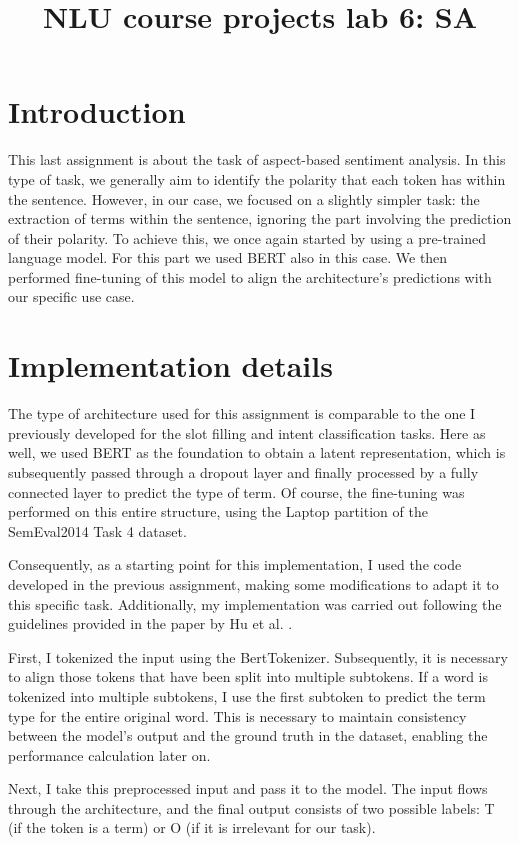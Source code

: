 \documentclass[a4paper]{article}
\title{NLU course projects lab 6: SA}
\begin{document}
\maketitle

\section{Introduction}
This last assignment is about the task of aspect-based sentiment analysis.
In this type of task, we generally aim to identify the polarity that each token has within the sentence. However, in our case, we focused on a slightly simpler task: the extraction of terms within the sentence, ignoring the part involving the prediction of their polarity.
To achieve this, we once again started by using a pre-trained language model. For this part we used BERT also in this case. We then performed fine-tuning of this model to align the architecture’s predictions with our specific use case.

\section{Implementation details}
The type of architecture used for this assignment is comparable to the one I previously developed for the slot filling and intent classification tasks.
Here as well, we used BERT as the foundation to obtain a latent representation, which is subsequently passed through a dropout layer and finally processed by a fully connected layer to predict the type of term. Of course, the fine-tuning was performed on this entire structure, using the Laptop partition of the SemEval2014 Task 4 dataset.

Consequently, as a starting point for this implementation, I used the code developed in the previous assignment, making some modifications to adapt it to this specific task.
Additionally, my implementation was carried out following the guidelines provided in the paper by Hu et al. \cite{hu2019opendomaintargetedsentimentanalysis}.

First, I tokenized the input using the BertTokenizer. Subsequently, it is necessary to align those tokens that have been split into multiple subtokens. If a word is tokenized into multiple subtokens, I use the first subtoken to predict the term type for the entire original word. This is necessary to maintain consistency between the model’s output and the ground truth in the dataset, enabling the performance calculation later on.

Next, I take this preprocessed input and pass it to the model. The input flows through the architecture, and the final output consists of two possible labels: T (if the token is a term) or O (if it is irrelevant for our task).
\end{document}
